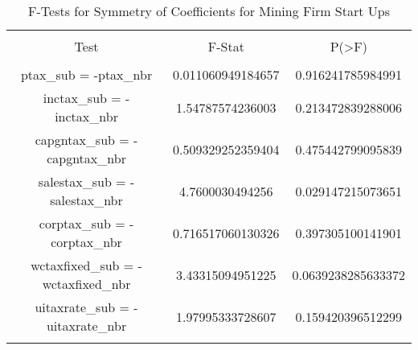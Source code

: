
\begin{table}[!htbp] \centering 
  \caption{F-Tests for Symmetry of Coefficients for Mining Firm Start Ups} 
  \label{} 
\begin{tabular}{@{\extracolsep{5pt}} ccc} 
\\[-1.8ex]\hline 
\hline \\[-1.8ex] 
Test & F-Stat & P(\textgreater F) \\ 
\hline \\[-1.8ex] 
ptax\_sub = -ptax\_nbr & 0.011060949184657 & 0.916241785984991 \\ 
inctax\_sub = -inctax\_nbr & 1.54787574236003 & 0.213472839288006 \\ 
capgntax\_sub = -capgntax\_nbr & 0.509329252359404 & 0.475442799095839 \\ 
salestax\_sub = -salestax\_nbr & 4.7600030494256 & 0.029147215073651 \\ 
corptax\_sub = -corptax\_nbr & 0.716517060130326 & 0.397305100141901 \\ 
wctaxfixed\_sub = -wctaxfixed\_nbr & 3.43315094951225 & 0.0639238285633372 \\ 
uitaxrate\_sub = -uitaxrate\_nbr & 1.97995333728607 & 0.159420396512299 \\ 
\hline \\[-1.8ex] 
\end{tabular} 
\end{table} 
